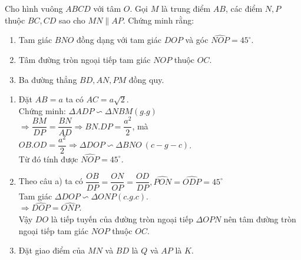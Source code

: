 \begin{ex}%
   Cho hình vuông $ABCD$ với tâm $O$. Gọi $M$ là trung điểm $AB$, các điểm $N,P$ thuộc $BC,CD$ sao cho $MN \parallel AP$. Chứng minh rằng:
\begin{enumerate}[1)]
\item Tam giác $BNO$ đồng dạng với tam giác $DOP$ và góc $\widehat{NOP}=45^\circ$.
\item Tâm đường tròn ngoại tiếp tam giác $NOP$ thuộc $OC$.
\item Ba đường thẳng $BD,AN,PM$ đồng quy.
 \end{enumerate}
\loigiai
    { \begin{center}
    \end{center}
    \begin{enumerate}[1)]
   \item Đặt $AB=a$ ta có $AC=a\sqrt{2}$.\\
Chứng minh: $\Delta ADP\backsim \Delta NBM\left(g.g\right)$\\
$\Rightarrow \dfrac{BM}{DP}=\dfrac{BN}{AD}\Rightarrow BN.DP=\dfrac{a^2}{2}$, mà $OB.OD=\dfrac{a^2}{2} \Rightarrow \Delta DOP \backsim \Delta BNO~(c-g-c)$.\\
Từ đó tính được $\widehat{NOP}=45^\circ$.
\item Theo câu a) ta có $\dfrac{OB}{DP}=\dfrac{ON}{OP}=\dfrac{OD}{DP}, \widehat{PON}=\widehat{ODP}=45^\circ$\\
Tam giác $\Delta DOP\backsim \Delta ONP\left(c.g.c\right)$.\\
$\Rightarrow \widehat{DOP}=\widehat{ONP}$.\\
Vậy $DO$ là tiếp tuyến của đường tròn ngoại tiếp $\Delta OPN$ nên tâm đường tròn ngoại tiếp tam giác $NOP$ thuộc $OC$.
\item Đặt giao điểm của $MN$ và $BD$ là $Q$ và $AP$ là $K$.

\end{enumerate}}
\end{ex}
